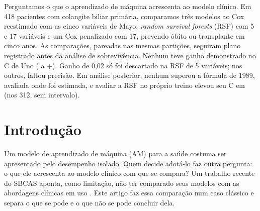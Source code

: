 \documentclass[12pt]{article}
\title{\titulo}
\author{Autoria omitida para revisão}
\begin{document}
\maketitle

\begin{abstract}
We ask what machine learning adds to a clinical model. In 418 patients with primary biliary cholangitis, we compared three models with a re-estimated five-variable Mayo Cox: random survival forests (RSF) with 5 and 17 variables and a 17-variable penalized Cox, predicting death or transplant within five years. Comparisons were paired, on the same folds, under a plan registered before the survival analysis. No model showed a demonstrated gain in Uno's C (differences \difMinEN{} to +\difMaxEN). A 0.02 gain was ruled out only for the five-variable RSF; for the other two, precision was lacking. Post hoc, none beat the 1989 Mayo formula, evaluated where it was fitted, and evaluating the RSF on its own training data raised its C by \otimRSFEN{} (in the 312, no interval).
\end{abstract}

\begin{resumo}
Perguntamos o que o aprendizado de máquina acrescenta ao modelo clínico. Em 418 pacientes com colangite biliar primária, comparamos três modelos ao Cox reestimado com as cinco variáveis de Mayo: \textit{random survival forests} (RSF) com 5 e 17 variáveis e um Cox penalizado com 17, prevendo óbito ou transplante em cinco anos. As comparações, pareadas nas mesmas partições, seguiram plano registrado antes da análise de sobrevivência. Nenhum teve ganho demonstrado no C de Uno (\difMin{} a +\difMax). Ganho de 0,02 só foi descartado na RSF de 5 variáveis; nos outros, faltou precisão. Em análise posterior, nenhum superou a fórmula de 1989, avaliada onde foi estimada, e avaliar a RSF no próprio treino elevou seu C em \otimRSF{} (nos 312, sem intervalo).
\end{resumo}

\section{Introdução}\label{sec:intro}

Um modelo de aprendizado de máquina (AM) para a saúde costuma ser apresentado pelo desempenho isolado. Quem decide adotá-lo faz outra pergunta: o que ele acrescenta ao modelo clínico com que se compara? Um trabalho recente do SBCAS aponta, como limitação, não ter comparado seus modelos com as abordagens clínicas em uso \cite{lodi2026febre}. Este artigo faz essa comparação num caso clássico e separa o que se pode e o que não se pode concluir dela.
\end{document}
